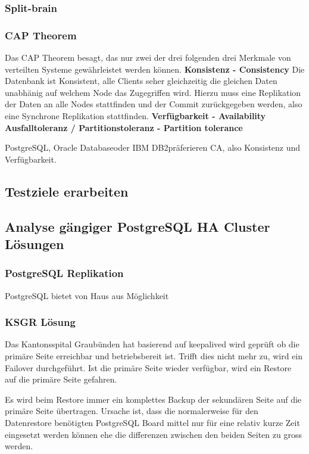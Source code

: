 \subsubsection{Split-brain}
\label{chap:Split-brain}
\subsubsection{CAP Theorem}
Das CAP Theorem besagt, das nur zwei der drei folgenden drei Merkmale von verteilten Systeme gewährleistet werden können\cite{EE6EQHU2}.
\textbf{Konsistenz - Consistency}
Die Datenbank ist Konsistent, alle Clients seher gleichzeitig die gleichen Daten unabhänig auf welchem Node das Zugegriffen wird.
Hierzu muss eine Replikation der Daten an alle Nodes stattfinden und der Commit zurückgegeben werden, also eine Synchrone Replikation stattfinden.
\textbf{Verfügbarkeit - Availability}
\textbf{Ausfalltoleranz / Partitionstoleranz - Partition tolerance}

\Gls{PostgreSQL}, \Gls{Oracle Database}oder \Gls{IBM DB2}präferieren CA, also Konsistenz und Verfügbarkeit.

\subsection{Testziele erarbeiten}
\subsection{Analyse gängiger PostgreSQL HA Cluster Lösungen}
\subsubsection{\Gls{PostgreSQL} Replikation}
PostgreSQL bietet von Haus aus Möglichkeit
\subsubsection{KSGR Lösung}
Das Kantonsspital Graubünden hat basierend auf \gls{keepalived} wird geprüft ob die primäre Seite erreichbar und betriebsbereit ist.
Trifft dies nicht mehr zu, wird ein \Gls{Failover} durchgeführt\cite{NLF2IDBZ}.
Ist die primäre Seite wieder verfügbar, wird ein Restore auf die primäre Seite gefahren.

Es wird beim Restore immer ein komplettes Backup der sekundären Seite auf die primäre Seite übertragen.
Ursache ist, dass die normalerweise für den Datenrestore benötigten \Gls{PostgreSQL} Board mittel nur für eine relativ kurze Zeit eingesetzt werden können ehe die differenzen zwischen den beiden Seiten zu gross werden.

